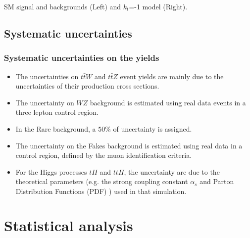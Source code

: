 \documentclass[11pt]{beamer}
\begin{document}
{\begin{frame}
\begin{minipage}[b]{.48\textwidth}
\begin{figure}
	\end{figure}
\end{minipage}
\begin{center}
\small{SM signal and backgrounds (Left) and $k_t$=-1 model (Right).}
\end{center}
\end{frame}
}


\begin{frame}
\subsection{Systematic uncertainties}
\frametitle{Systematic uncertainties on the yields}
\begin{itemize}
\item The uncertainties on $t\bar{t}W$ and $t\bar{t}Z$ event yields are mainly due to the uncertainties of their production cross sections. 
\item The uncertainty on $WZ$ background is estimated using real data events in a three lepton control region. 
\item In the Rare background, a $50\%$ of uncertainty is assigned.
\item The uncertainty on the Fakes background is estimated using real data in a control region, defined by the muon identification criteria. 
\item For the Higgs processes $tH$ and $ttH$, the uncertainty are due to the theoretical parameters (e.g. the strong coupling constant $\alpha_s$ and Parton Distribution Functions (PDF) ) used in that simulation.
\end{itemize}
\end{frame}


\section{Statistical analysis}
\end{document}
